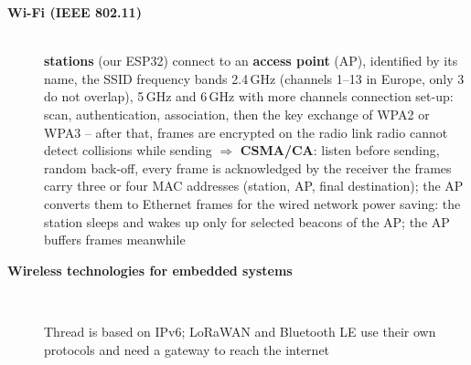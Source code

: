 \begin{description}
\item[{\rot\bf Wi-Fi (IEEE 802.11)}]~\\[-\lblskip]
\bi
	\ite \textbf{stations} (our ESP32) connect to an \textbf{access point} (AP), identified by its name, the SSID
	\ite frequency bands 2.4\,GHz (channels 1--13 in Europe, only 3 do not overlap), 5\,GHz and 6\,GHz with more channels
	\ite connection set-up: scan, authentication, association, then the key exchange of WPA2 or WPA3 -- after that, frames are encrypted on the radio link
	\ite radio cannot detect collisions while sending $\Rightarrow$ \textbf{CSMA/CA}: listen before sending, random back-off, every frame is acknowledged by the receiver
	\ite the frames carry three or four MAC addresses (station, AP, final destination); the AP converts them to Ethernet frames for the wired network
	\ite power saving: the station sleeps and wakes up only for selected beacons of the AP; the AP buffers frames meanwhile
\ei
\os{\newpage}

\item[{\rot\bf Wireless technologies for embedded systems}]~\\[-\lblskip]
\begin{center}
\end{center}
\bi
	\ite Thread is based on IPv6; LoRaWAN and Bluetooth LE use their own protocols and need a gateway to reach the internet
\ei
\os{\newpage}
\end{description}

